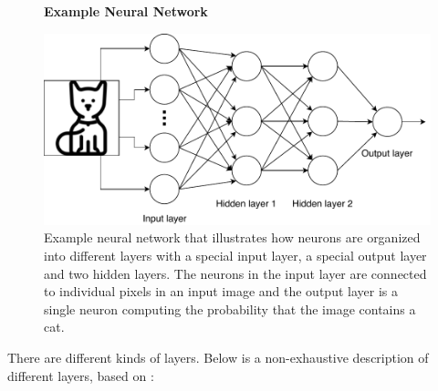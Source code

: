 \begin{figure}
    \centering
    \textbf{Example Neural Network}\par\medskip
    \includegraphics[width=\textwidth]{./pictures/method/example_neural_network}
    \caption{Example neural network that illustrates how neurons are organized
        into different layers with a special input layer, a special output layer
        and two hidden layers. The neurons in the input layer are connected to
        individual pixels in an input image and the output layer is a single
        neuron computing the probability that the image contains a cat.}
    \label{fig:example_nn}
\end{figure}

There are different kinds of layers. Below is a
non-exhaustive description of different layers, based on
\citep{oshea2015,DBLP:series/sci/2012-385,Goodfellow-et-al-2016,
mikolov2013linguistic,JMLR:v15:srivastava14a}:

